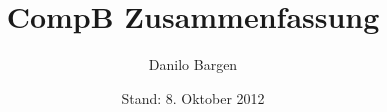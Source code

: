 


\subject{Compilerbau}
\title{CompB Zusammenfassung}
\author{Danilo Bargen}
\date{Stand: 8. Oktober 2012}











